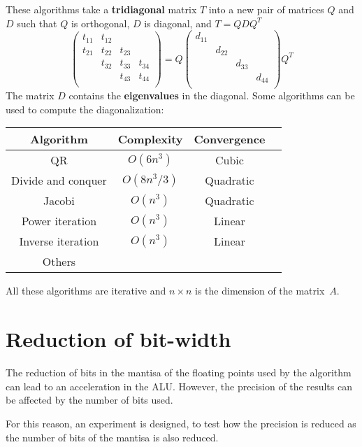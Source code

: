 \documentclass[11pt,a4paper]{article}
\newcommand*\mat[1]{ \begin{pmatrix} #1 \end{pmatrix}}
\begin{document}
These algorithms take a \textbf{tridiagonal} matrix $T$ into a new pair of 
matrices $Q$ and $D$ such that $Q$ is orthogonal, $D$ is diagonal, and $T = Q 
D Q^T$
%
$$
	\mat{
		t_{11} & t_{12} &        &        \\
		t_{21} & t_{22} & t_{23} &        \\
		       & t_{32} & t_{33} & t_{34} \\
		       &        & t_{43} & t_{44} \\
	}=
	Q
	\mat{
		d_{11} &        &        &        \\
		       & d_{22} &        &        \\
		       &        & d_{33} &        \\
		       &        &        & d_{44} \\
	}
	Q^T
$$
%
The matrix $D$ contains the \textbf{eigenvalues} in the diagonal. Some 
algorithms can be used to compute the diagonalization:
%
\begin{center}
\begin{tabular}{c c c c}
	\toprule
	Algorithm							& Complexity  & Convergence	\\
	\midrule
	QR                  & $O(6n^3)$ 	& Cubic 			\\
	Divide and conquer  & $O(8n^3/3)$ & Quadratic 	\\
	Jacobi              & $O(n^3)$    & Quadratic 	\\
	Power iteration			& $O(n^3)$    & Linear 			\\
	Inverse iteration	  & $O(n^3)$    & Linear 			\\
	Others							&             &          		\\
	\bottomrule
\end{tabular}
\end{center}
%
%
All these algorithms are iterative and $n \times n$ is the dimension of the 
matrix~$A$.

\section{Reduction of bit-width}

The reduction of bits in the mantisa of the floating points used by the 
algorithm can lead to an acceleration in the ALU. However, the precision of the 
results can be affected by the number of bits used.

For this reason, an experiment is designed, to test how the precision is reduced 
as the number of bits of the mantisa is also reduced.
\end{document}
